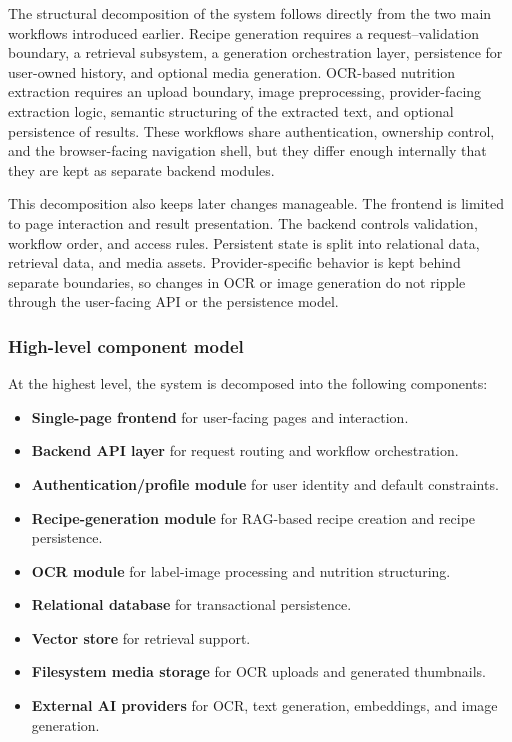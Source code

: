 The structural decomposition of the system follows directly from the two
main workflows introduced earlier. Recipe generation requires a
request--validation boundary, a retrieval subsystem, a generation
orchestration layer, persistence for user-owned history, and optional
media generation. OCR-based nutrition extraction requires an upload
boundary, image preprocessing, provider-facing extraction logic,
semantic structuring of the extracted text, and optional persistence of
results. These workflows share authentication, ownership control, and
the browser-facing navigation shell, but they differ enough internally
that they are kept as separate backend modules.

This decomposition also keeps later changes manageable. The frontend is
limited to page interaction and result presentation. The backend
controls validation, workflow order, and access rules. Persistent state
is split into relational data, retrieval data, and media assets.
Provider-specific behavior is kept behind separate boundaries, so
changes in OCR or image generation do not ripple through the user-facing
API or the persistence model.

\subsubsection{High-level component model}

At the highest level, the system is decomposed into the following
components:

\begin{itemize}
	\item \textbf{Single-page frontend} for user-facing pages and interaction.
	\item \textbf{Backend API layer} for request routing and workflow
	orchestration.
	\item \textbf{Authentication/profile module} for user identity and
	default constraints.
	\item \textbf{Recipe-generation module} for RAG-based recipe creation
	and recipe persistence.
	\item \textbf{OCR module} for label-image processing and nutrition
	structuring.
	\item \textbf{Relational database} for transactional persistence.
	\item \textbf{Vector store} for retrieval support.
	\item \textbf{Filesystem media storage} for OCR uploads and generated
	thumbnails.
	\item \textbf{External AI providers} for OCR, text generation,
	embeddings, and image generation.
\end{itemize}

